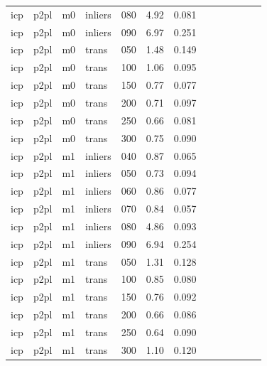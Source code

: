 \begin{table}[htbp]
\begin{tabular}{lllllrrrrrrrr}
  icp & p2pl & m0 & inliers & 080 & 4.92 & 0.081 \\
  icp & p2pl & m0 & inliers & 090 & 6.97 & 0.251 \\
  icp & p2pl & m0 & trans & 050 & 1.48 & 0.149 \\
  icp & p2pl & m0 & trans & 100 & 1.06 & 0.095 \\
  icp & p2pl & m0 & trans & 150 & 0.77 & 0.077 \\
  icp & p2pl & m0 & trans & 200 & 0.71 & 0.097 \\
  icp & p2pl & m0 & trans & 250 & 0.66 & 0.081 \\
  icp & p2pl & m0 & trans & 300 & 0.75 & 0.090 \\
  icp & p2pl & m1 & inliers & 040 & 0.87 & 0.065 \\
  icp & p2pl & m1 & inliers & 050 & 0.73 & 0.094 \\
  icp & p2pl & m1 & inliers & 060 & 0.86 & 0.077 \\
  icp & p2pl & m1 & inliers & 070 & 0.84 & 0.057 \\
  icp & p2pl & m1 & inliers & 080 & 4.86 & 0.093 \\
  icp & p2pl & m1 & inliers & 090 & 6.94 & 0.254 \\
  icp & p2pl & m1 & trans & 050 & 1.31 & 0.128 \\
  icp & p2pl & m1 & trans & 100 & 0.85 & 0.080 \\
  icp & p2pl & m1 & trans & 150 & 0.76 & 0.092 \\
  icp & p2pl & m1 & trans & 200 & 0.66 & 0.086 \\
  icp & p2pl & m1 & trans & 250 & 0.64 & 0.090 \\
  icp & p2pl & m1 & trans & 300 & 1.10 & 0.120 \\
\bottomrule
\end{tabular}
\end{table}
